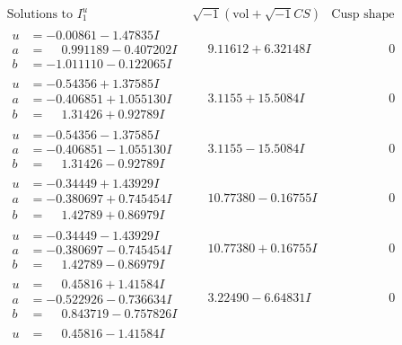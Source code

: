 \documentclass[1p]{elsarticle_modified}
\theoremstyle{definition}
\newcommand{\I}{\sqrt{-1}}
\begin{document}
$$\begin{array}{c|c|c}
\text{Solutions to }I^u_{1}& \I (\text{vol} + \sqrt{-1}CS) & \text{Cusp shape}\\
 \hline 
\begin{aligned}
u &= -0.00861 - 1.47835 I \\
a &= \phantom{-}0.991189 - 0.407202 I \\
b &= -1.011110 - 0.122065 I\end{aligned}
 & \phantom{-}9.11612 + 6.32148 I & \phantom{-0.000000 } 0 \\ \hline\begin{aligned}
u &= -0.54356 + 1.37585 I \\
a &= -0.406851 + 1.055130 I \\
b &= \phantom{-}1.31426 + 0.92789 I\end{aligned}
 & \phantom{-}3.1155 + 15.5084 I & \phantom{-0.000000 } 0 \\ \hline\begin{aligned}
u &= -0.54356 - 1.37585 I \\
a &= -0.406851 - 1.055130 I \\
b &= \phantom{-}1.31426 - 0.92789 I\end{aligned}
 & \phantom{-}3.1155 - 15.5084 I & \phantom{-0.000000 } 0 \\ \hline\begin{aligned}
u &= -0.34449 + 1.43929 I \\
a &= -0.380697 + 0.745454 I \\
b &= \phantom{-}1.42789 + 0.86979 I\end{aligned}
 & \phantom{-}10.77380 - 0.16755 I & \phantom{-0.000000 } 0 \\ \hline\begin{aligned}
u &= -0.34449 - 1.43929 I \\
a &= -0.380697 - 0.745454 I \\
b &= \phantom{-}1.42789 - 0.86979 I\end{aligned}
 & \phantom{-}10.77380 + 0.16755 I & \phantom{-0.000000 } 0 \\ \hline\begin{aligned}
u &= \phantom{-}0.45816 + 1.41584 I \\
a &= -0.522926 - 0.736634 I \\
b &= \phantom{-}0.843719 - 0.757826 I\end{aligned}
 & \phantom{-}3.22490 - 6.64831 I & \phantom{-0.000000 } 0 \\ \hline\begin{aligned}
u &= \phantom{-}0.45816 - 1.41584 I \\

\end{aligned}
\end{array}$$
\end{document}
